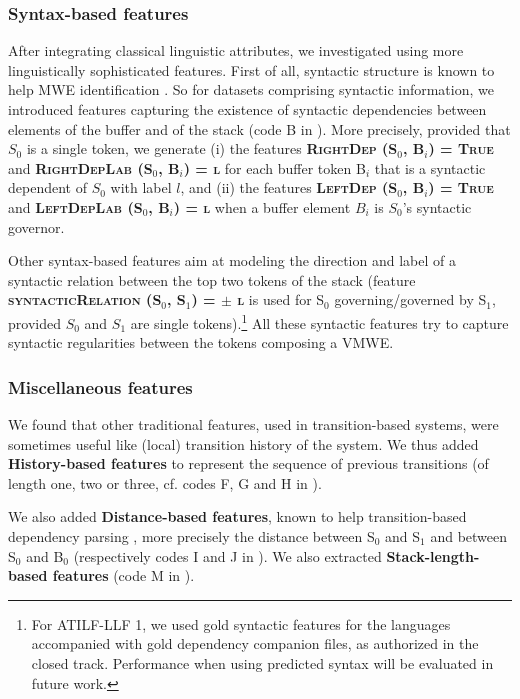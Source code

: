 \documentclass[output=paper,modfonts]{langscibook}
\begin{document}
\subsubsection*{Syntax-based features}
After integrating classical linguistic attributes, we investigated using more linguistically sophisticated features. First of all, syntactic structure is known to help MWE identification \citep{fazly-cook-stevenson:2009:CL,seretan2011syntax,nagyt-vincze:2014:MWE}. So for datasets comprising syntactic information, we introduced features capturing the existence of syntactic dependencies between elements of the buffer and of the stack (code B in ).  More precisely, provided that $S_0$ is a single token, we generate (i) the features \textbf{\textsc{RightDep (S$_0$, B$_i$) = True}} and \textbf{\textsc{RightDepLab (S$_0$, B$_i$) = l}} for each buffer token B$_i$ that is a syntactic dependent of $S_0$ with label $l$, and (ii) the features \textbf{\textsc{LeftDep (S$_0$, B$_i$) = True}} and \textbf{\textsc{LeftDepLab (S$_0$, B$_i$) = l}} when a buffer element $B_i$ is $S_0$'s syntactic governor.

Other syntax-based features aim at modeling the direction and label of a syntactic relation between the top two tokens of the stack (feature \textbf{\textsc{syntacticRelation (S$_0$, S$_1$) = $\pm$ l }} is used for S$_0$ governing/governed by S$_1$, provided $S_0$ and $S_1$ are single tokens).\footnote{For ATILF-LLF 1, we used gold syntactic features for the languages accompanied with gold dependency companion files, as authorized in the closed track. Performance when using predicted syntax will be evaluated in future work.} All these syntactic features try to capture syntactic regularities between the tokens composing a VMWE.
\subsubsection*{Miscellaneous features}
We found that other traditional features, used in transition-based systems,  were sometimes useful like  (local) transition history of the system. We thus added \textbf{History-based features} to represent the sequence of previous transitions (of length one, two or three, cf. codes F, G and H \-in  ).

We also added \textbf{Distance-based features}, known to help transition-based dependency parsing \citep{zhang2011transition}, more precisely the distance between S$_0$ and  S$_1$ and between S$_0$ and B$_0$ (respectively codes I and J in ). We also extracted \textbf{Stack-length-based features} (code M in  ).
\end{document}
